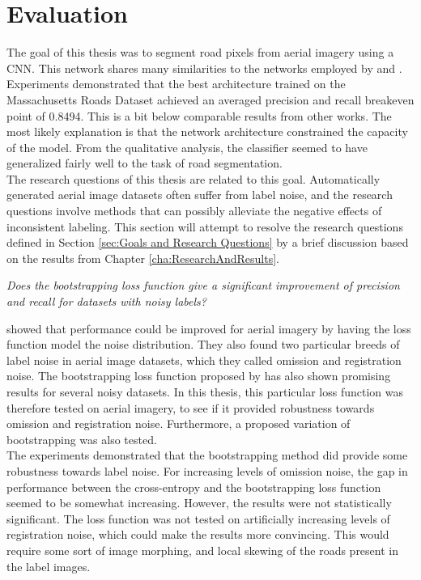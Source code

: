 \section{Evaluation}
\label{sec:SummaryDiscussion}
The goal of this thesis was to segment road pixels from aerial imagery using a \ac{CNN}. This network shares many similarities to the networks employed by \cite{Mnih_aerial_images_noisy} and \citep{MnihThesis}. Experiments demonstrated that the best architecture trained on the Massachusetts Roads Dataset achieved an averaged precision and recall breakeven point of 0.8494. This is a bit below comparable results from other works. The most likely explanation is that the network architecture constrained the capacity of the model. From the qualitative analysis, the classifier seemed to have generalized fairly well to the task of road segmentation.\\

 The research questions of this thesis are related to this goal. Automatically generated aerial image datasets often suffer from label noise, and the research questions involve methods that can possibly alleviate the negative effects of inconsistent labeling. This section will attempt to resolve the research questions defined in Section \ref{sec:Goals and Research Questions} by a brief discussion based on the results from Chapter \ref{cha:ResearchAndResults}.
 
\begin{description}[ style=nextline, leftmargin=1.5em, rightmargin=1.5em]
\item[Research question 1:]{\it Does the bootstrapping loss function give a significant improvement of precision and recall for datasets with noisy labels?}
\end{description}

\cite{Mnih_aerial_images_noisy} showed that performance could be improved for aerial imagery by having the loss function model the noise distribution. They also found two particular breeds of label noise in aerial image datasets, which they called omission and registration noise. The bootstrapping loss function proposed by \cite{Reed_noisy_labels_bootstrapping} has also shown promising results for several noisy datasets. In this thesis, this particular loss function was therefore tested on aerial imagery, to see if it provided robustness towards omission and registration noise. Furthermore, a proposed variation of bootstrapping was also tested.\\

The experiments demonstrated that the bootstrapping method did provide some robustness towards label noise. For increasing levels of omission noise, the gap in performance between the cross-entropy and the bootstrapping loss function seemed to be somewhat increasing. However, the results were not statistically significant. The loss function was not tested on artificially increasing levels of registration noise, which could make the results more convincing. This would require some sort of image morphing, and local skewing of the roads present in the label images. \\

